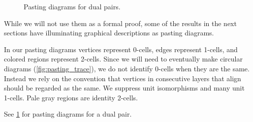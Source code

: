\documentclass[11pt]{amsart}
\begin{document}
\begin{figure}
\hspace{.5cm}
\raisebox{1.5cm}{=}
\hspace{.5cm}
\caption{Pasting diagrams for dual pairs.
}\label{fig;dual_pairs}
\end{figure}

\begin{rmk}
While we will not use them as a formal proof, some of the results in the next sections have illuminating graphical descriptions as pasting diagrams.  

In our pasting diagrams vertices represent 0-cells, edges represent 1-cells, and colored regions represent 2-cells.  Since we will need to eventually make circular diagrams (\cref{fig:pasting_trace}), we do not identify 0-cells when they are the same.  Instead we rely on the convention that vertices in consecutive layers that align should be regarded as the same.
We suppress unit isomorphisms and many unit 1-cells.  Pale gray regions are identity 2-cells.

See \cref{fig;dual_pairs} for pasting diagrams for a dual pair.
\end{rmk}
\end{document}
